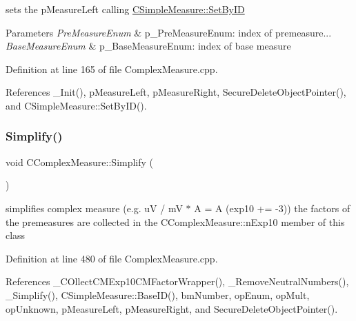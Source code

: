 sets the p\+Measure\+Left calling \hyperlink{classCSimpleMeasure_a6945aa333dca5623482d38cd9a7e3225}{C\+Simple\+Measure\+::\+Set\+By\+ID} 


\begin{DoxyParams}{Parameters}
{\em Pre\+Measure\+Enum} & p\+\_\+\+Pre\+Measure\+Enum\+: index of premeasure... \\
\hline
{\em Base\+Measure\+Enum} & p\+\_\+\+Base\+Measure\+Enum\+: index of base measure \\
\hline
\end{DoxyParams}


Definition at line 165 of file Complex\+Measure.\+cpp.



References \+\_\+\+Init(), p\+Measure\+Left, p\+Measure\+Right, Secure\+Delete\+Object\+Pointer(), and C\+Simple\+Measure\+::\+Set\+By\+I\+D().

\mbox{\label{classCComplexMeasure_addb4e69033f2c32fb3bf4a3aef5e1470}} 
\subsubsection{\texorpdfstring{Simplify()}{Simplify()}}
{\footnotesize\ttfamily void C\+Complex\+Measure\+::\+Simplify (\begin{DoxyParamCaption}{ }\end{DoxyParamCaption})}



simplifies complex measure (e.\+g. uV / mV $\ast$ A = A (exp10 += -\/3)) the factors of the premeasures are collected in the C\+Complex\+Measure\+::n\+Exp10 member of this class 



Definition at line 480 of file Complex\+Measure.\+cpp.



References \+\_\+\+C\+Ollect\+C\+M\+Exp10\+C\+M\+Factor\+Wrapper(), \+\_\+\+Remove\+Neutral\+Numbers(), \+\_\+\+Simplify(), C\+Simple\+Measure\+::\+Base\+I\+D(), bm\+Number, op\+Enum, op\+Mult, op\+Unknown, p\+Measure\+Left, p\+Measure\+Right, and Secure\+Delete\+Object\+Pointer().

\mbox{\label{classCComplexMeasure_a1b777eef864d0c7a959dbeee321e881d}} 
